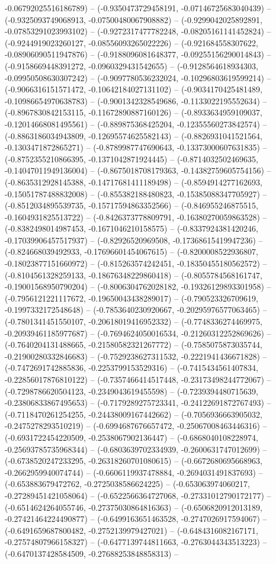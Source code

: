 -0.06792025516186789) -- (-0.9350473729458191, -0.07146725683040439) -- (-0.9325093749068913, -0.07500480067908882) -- (-0.9299042025892891, -0.07853291023993102) -- (-0.9272317477782248, -0.08205161141452824) -- (-0.9244919023260127, -0.08556093265022226) -- (-0.921684558307622, -0.08906090511947876) -- (-0.9188096081648377, -0.09255156290014843) -- (-0.9158669448391272, -0.0960329431542655) -- (-0.9128564618934303, -0.09950508630307242) -- (-0.9097780536232024, -0.10296803619599214) -- (-0.9066316151571472, -0.10642184027131102) -- (-0.9034170425481489, -0.10986654970638783) -- (-0.9001342328549686, -0.1133022195552634) -- (-0.8967830842153115, -0.11672890887160126) -- (-0.8933634959109037, -0.12014668081495561) -- (-0.889875368425204, -0.12355560273842574) -- (-0.8863186034943809, -0.12695574625582143) -- (-0.8826931041521564, -0.1303471872865271) -- (-0.8789987747690643, -0.13373000607631835) -- (-0.8752355210866395, -0.1371042871924445) -- (-0.8714032502469635, -0.14047011949136004) -- (-0.8675018708179363, -0.14382759605754156) -- (-0.8635312928145388, -0.14717681411189498) -- (-0.8594914277162693, -0.15051787488832008) -- (-0.855382188480823, -0.15385088347705927) -- (-0.8512034895539735, -0.15717594863352566) -- (-0.846955246875515, -0.1604931825513722) -- (-0.8426373778809791, -0.16380270059863528) -- (-0.8382498014987453, -0.1671046210158575) -- (-0.8337924381420246, -0.17039906457517937) -- (-0.82926520969508, -0.17368615419947236) -- (-0.824668039492933, -0.17696601454067615) -- (-0.8200008522936807, -0.18023877151660972) -- (-0.815263574242451, -0.18350455180562572) -- (-0.8104561328259133, -0.18676348229860418) -- (-0.8055784568161747, -0.19001568950790204) -- (-0.8006304762028182, -0.19326129893301958) -- (-0.7956121221117672, -0.19650043438289017) -- (-0.790523326709619, -0.1997332172548648) -- (-0.7853640230920667, -0.20295976577063465) -- (-0.7801341451550107, -0.20618019416952332) -- (-0.7748336274469975, -0.20939461185977687) -- (-0.7694624050016534, -0.21260312252869626) -- (-0.7640204131488665, -0.21580582321267772) -- (-0.7585075873035744, -0.21900280332846683) -- (-0.7529238627311532, -0.2221941436671828) -- (-0.7472691742885836, -0.2253799153529316) -- (-0.7415434561407834, -0.22856017876810122) -- (-0.7357466414517448, -0.23173498244772067) -- (-0.7298786620504123, -0.2349043619455598) -- (-0.7239394480715639, -0.23806833867495653) -- (-0.7179289275723341, -0.24122691872767493) -- (-0.7118470261254255, -0.24438009167442662) -- (-0.7056936663905032, -0.2475278293510219) -- (-0.6994687676657472, -0.25067008463446316) -- (-0.6931722454220509, -0.2538067902136447) -- (-0.6868040108228974, -0.25693785735968344) -- (-0.6803639702334939, -0.2600631747012699) -- (-0.6738520247233295, -0.26318260701080615) -- (-0.6672680695668963, -0.2662959940074744) -- (-0.6606119937478884, -0.2694031491837693) -- (-0.653883679472762, -0.2725038586624225) -- (-0.653063974060217, -0.27289451421058064) -- (-0.6522566364727068, -0.27331012790172177) -- (-0.6514624264055746, -0.27375030864816363) -- (-0.6506820912013189, -0.27421464224490877) -- (-0.6499163651463528, -0.2747026917594067) -- (-0.6491659687800482, -0.2752139979427021) -- (-0.6484316082167171, -0.27574807966158327) -- (-0.6477139744811663, -0.2763044343513223) -- (-0.6470137428584509, -0.27688253848858313) -- 